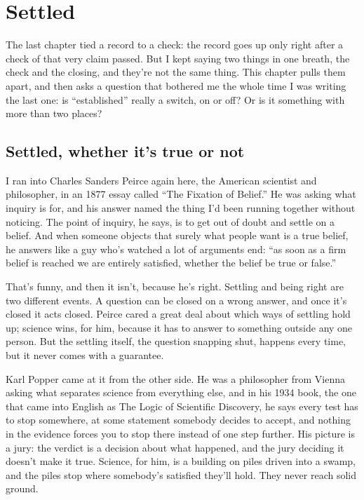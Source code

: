 \documentclass[11pt,twoside]{article}
\theoremstyle{thielethm}
\theoremstyle{thieledef}
\theoremstyle{thieledef}
\theoremstyle{thieledef}
\theoremstyle{thielethm}
\theoremstyle{thieleobs}
\theoremstyle{thielethm}
\begin{document}
\section{Settled}
\label{sec:settled}

The last chapter tied a record to a check: the record goes up only right after a check of that very claim passed. But I kept saying two things in one breath, the check and the closing, and they're not the same thing. This chapter pulls them apart, and then asks a question that bothered me the whole time I was writing the last one: is ``established'' really a switch, on or off? Or is it something with more than two places?

\subsection{Settled, whether it's true or not}

I ran into Charles Sanders Peirce again here, the American scientist and philosopher, in an 1877 essay called ``The Fixation of Belief.'' He was asking what inquiry is for, and his answer named the thing I'd been running together without noticing. The point of inquiry, he says, is to get out of doubt and settle on a belief. And when someone objects that surely what people want is a true belief, he answers like a guy who's watched a lot of arguments end: ``as soon as a firm belief is reached we are entirely satisfied, whether the belief be true or false.''

That's funny, and then it isn't, because he's right. Settling and being right are two different events. A question can be closed on a wrong answer, and once it's closed it acts closed. Peirce cared a great deal about which ways of settling hold up; science wins, for him, because it has to answer to something outside any one person. But the settling itself, the question snapping shut, happens every time, but it never comes with a guarantee.

Karl Popper came at it from the other side. He was a philosopher from Vienna asking what separates science from everything else, and in his 1934 book, the one that came into English as The Logic of Scientific Discovery, he says every test has to stop somewhere, at some statement somebody decides to accept, and nothing in the evidence forces you to stop there instead of one step further. His picture is a jury: the verdict is a decision about what happened, and the jury deciding it doesn't make it true. Science, for him, is a building on piles driven into a swamp, and the piles stop where somebody's satisfied they'll hold. They never reach solid ground.
\end{document}
